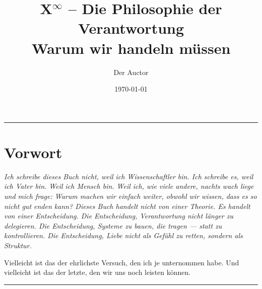 \documentclass[12pt, ngerman, parskip=full]{scrartcl} %
\begin{document}
\title{X$^\infty$ – Die Philosophie der Verantwortung \\ Warum wir handeln müssen}
\author{Der Auctor}
\date{\today}
\maketitle


\clearpage



\noindent\rule{\linewidth}{0.4pt}

\section*{Vorwort}
{\itshape Ich schreibe dieses Buch nicht, weil ich Wissenschaftler bin. Ich schreibe es, weil ich Vater bin. Weil ich Mensch bin. Weil ich, wie viele andere, nachts wach liege und mich frage: Warum machen wir einfach weiter, obwohl wir wissen, dass es so nicht gut enden kann?\vspace{\baselineskip}
Dieses Buch handelt nicht von einer Theorie. Es handelt von einer Entscheidung.\vspace{\baselineskip}
Die Entscheidung, Verantwortung nicht länger zu delegieren.
Die Entscheidung, Systeme zu bauen, die tragen — statt zu kontrollieren.
Die Entscheidung, Liebe nicht als Gefühl zu retten, sondern als Struktur.\vspace{\baselineskip}

Vielleicht ist das der ehrlichste Versuch, den ich je unternommen habe. Und vielleicht ist das der letzte, den wir uns noch leisten können.}

\noindent\rule{\linewidth}{0.4pt}

\clearpage

\clearpage

\vspace{\baselineskip}
\end{document}
